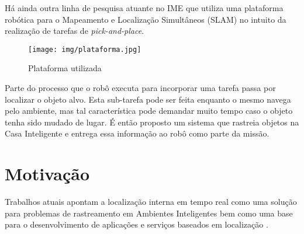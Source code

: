 

Há ainda outra linha de pesquisa atuante no IME que utiliza uma plataforma robótica para o Mapeamento e Localização Simultâneos (SLAM) no intuito da realização de tarefas de \textit{pick-and-place}. %

\begin{figure}[ht]
\centering
\texttt{[image: img/plataforma.jpg]}%
\caption{Plataforma utilizada\label{fig:pioneer}}
\end{figure}

Parte do processo que o robô executa para incorporar uma tarefa passa por localizar o objeto alvo. Esta sub-tarefa pode ser feita enquanto o mesmo navega pelo ambiente, mas tal característica pode demandar muito tempo caso o objeto tenha sido mudado de lugar. É então proposto um sistema que rastreia objetos na Casa Inteligente e entrega essa informação ao robô como parte da missão.

\section{Motivação}
Trabalhos atuais apontam a localização interna em tempo real \cite{Tapia2011} como uma solução para problemas de rastreamento em Ambientes Inteligentes bem como uma base para o desenvolvimento de aplicações e serviços baseados em localização \cite{Seco2009}.

